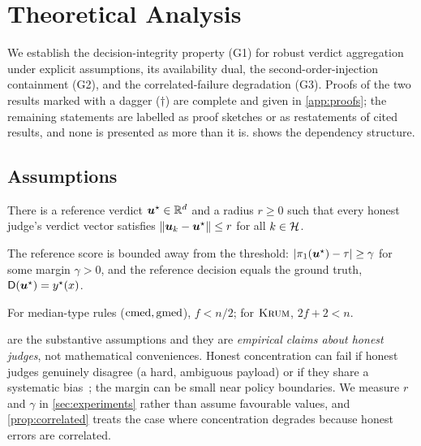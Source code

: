 \section{Theoretical Analysis}
\label{sec:theory}

We establish the decision-integrity property (G1) for robust verdict aggregation under
explicit assumptions, its availability dual, the second-order-injection containment (G2),
and the correlated-failure degradation (G3). Proofs of the two results marked with a
dagger ($\dagger$) are complete and given in \cref{app:proofs}; the remaining statements
are labelled as proof sketches or as restatements of cited results, and none is presented
as more than it is.  shows the dependency structure.



\subsection{Assumptions}
\begin{assumption}
\label{ass:concentration}
There is a reference verdict $\bm{u}^{\star}\in\mathbb{R}^d$ and a radius $r\ge 0$ such that every honest
judge's verdict vector satisfies $\lVert \bm{u}_k-\bm{u}^{\star}\rVert\le r$ for all $k\in\mathcal{H}$.
\end{assumption}

\begin{assumption}
\label{ass:margin}
The reference score is bounded away from the threshold: $|\pi_1(\bm{u}^{\star})-\tau|\ge\gamma$
for some margin $\gamma>0$, and the reference decision equals the ground truth,
$\mathsf{D}(\bm{u}^{\star})=y^\star(x)$.
\end{assumption}

\begin{assumption}
\label{ass:fraction}
For median-type rules ($\operatorname{cmed},\operatorname{gmed}$), $f<n/2$; for $\textsc{Krum}$, $2f{+}2<n$.
\end{assumption}

\begin{remark}
 are the substantive assumptions and they are
\emph{empirical claims about honest judges}, not mathematical conveniences. Honest
concentration can fail if honest judges genuinely disagree (a hard, ambiguous payload) or
if they share a systematic bias~\cite{zheng2023judging,wang2023notfair}; the margin can be
small near policy boundaries. We measure $r$ and $\gamma$ in \cref{sec:experiments} rather
than assume favourable values, and \cref{prop:correlated} treats the case where
concentration degrades because honest errors are correlated.
\end{remark}


